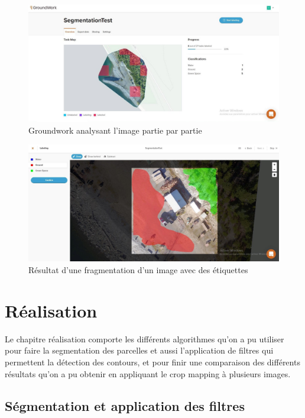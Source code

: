 \documentclass[12pt, openany]{report}
\begin{document}
\begin{figure}[H]
\centering
\includegraphics[scale=0.4]{groundwork_screen1.jpg}
\caption{Groundwork analysant l'image partie par partie}
\end{figure}

\begin{figure}[H]
\centering
\includegraphics[scale=0.4]{groundwork_screen2.jpg}
\caption{Résultat d'une fragmentation d'un image avec des étiquettes}
\end{figure}


\chapter{Réalisation}

Le chapitre réalisation comporte les différents algorithmes qu'on a pu utiliser pour faire la segmentation des parcelles et aussi l'application de filtres qui permettent la détection des contours, et pour finir une comparaison des différents résultats qu'on a pu obtenir en appliquant le crop mapping à plusieurs images. 



\newpage

\section{Ségmentation et application des filtres}
\end{document}

